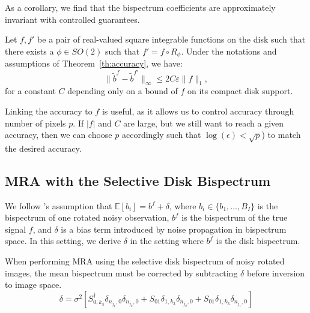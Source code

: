 As a corollary, we find that the bispectrum coefficients are approximately invariant with controlled guarantees.

\begin{corollary}
    Let $f, f'$ be a pair of real-valued square integrable functions on the disk such that there exists a $\phi \in SO(2)$ such that $f' = f \circ R_\phi$. Under the notations and assumptions of Theorem~\ref{th:accuracy}, we have:
    \begin{equation}
        \| \tilde b^{f} - \tilde b^{f'}\|_\infty \leq 2C \varepsilon \|f\|_1,
    \end{equation}
    for a constant \( C \) depending only on a bound of \( f \) on its compact disk support.
\end{corollary}

Linking the accuracy to $f$ is useful, as it allows us to control accuracy through number of pixels $p$. If $|f|$ and $C$ are large, but we still want to reach a given accuracy, then we can choose $p$ accordingly such that $\log(\epsilon) < \sqrt{p}$) to match the desired accuracy.

\subsection{MRA with the Selective Disk Bispectrum}

We follow \cite{bendory2018bispectrum}'s assumption that $\mathbb{E}[b_i] = b^f + \delta$, where $b_i \in \{b_1, ..., B_I\}$ is the bispectrum of one rotated noisy observation, $b^f$ is the bispectrum of the true signal $f$, and $\delta$ is a bias term introduced by noise propagation in bispectrum space. In this setting, we derive $\delta$ in the setting where $b^f$ is the disk bispectrum.

\begin{proposition}
     When performing MRA using the selective disk bispectrum of noisy rotated images, the mean bispectrum must be corrected by subtracting $\delta$ before inversion to image space.
     \begin{equation}
         \delta = \sigma^2[S^\dagger_{0, k_3}  \delta_{n_{j_1},0}\delta_{n_{j_2},0} + S_{01}     \delta_{1, k_3}\delta_{n_{j_2},0}+ S_{01} \delta_{1, k_3}\delta_{n_{j_1},0}]
     \end{equation}
     \label{eq:mra-correction}

\end{proposition}
